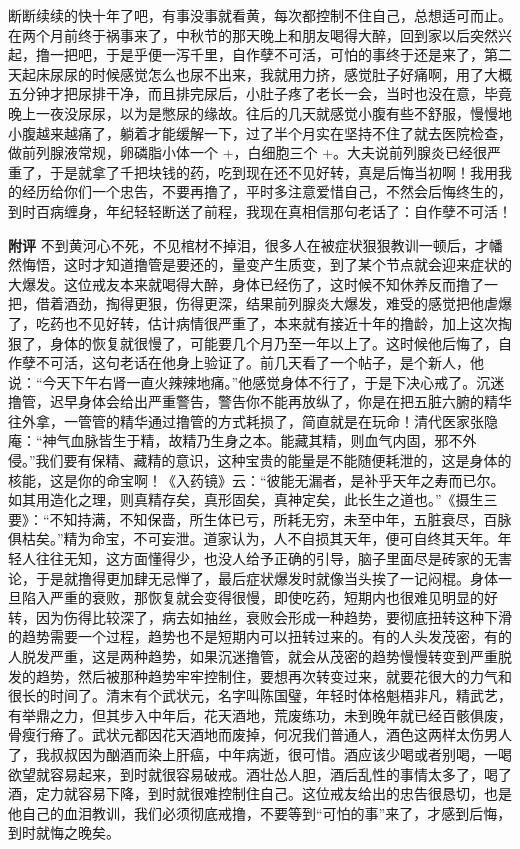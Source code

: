 \begin{case}
    断断续续的快十年了吧，有事没事就看黄，每次都控制不住自己，总想适可而止。在两个月前终于祸事来了，中秋节的那天晚上和朋友喝得大醉，回到家以后突然兴起，撸一把吧，于是乎便一泻千里，自作孽不可活，可怕的事终于还是来了，第二天起床尿尿的时候感觉怎么也尿不出来，我就用力挤，感觉肚子好痛啊，用了大概五分钟才把尿排干净，而且排完尿后，小肚子疼了老长一会，当时也没在意，毕竟晚上一夜没尿尿，以为是憋尿的缘故。往后的几天就感觉小腹有些不舒服，慢慢地小腹越来越痛了，躺着才能缓解一下，过了半个月实在坚持不住了就去医院检查，做前列腺液常规，卵磷脂小体一个 +，白细胞三个 +。大夫说前列腺炎已经很严重了，于是就拿了千把块钱的药，吃到现在还不见好转，真是后悔当初啊！我用我的经历给你们一个忠告，不要再撸了，平时多注意爱惜自己，不然会后悔终生的，到时百病缠身，年纪轻轻断送了前程，我现在真相信那句老话了：自作孽不可活！

    \textbf{附评} 不到黄河心不死，不见棺材不掉泪，很多人在被症状狠狠教训一顿后，才幡然悔悟，这时才知道撸管是要还的，量变产生质变，到了某个节点就会迎来症状的大爆发。这位戒友本来就喝得大醉，身体已经伤了，这时候不知休养反而撸了一把，借着酒劲，掏得更狠，伤得更深，结果前列腺炎大爆发，难受的感觉把他虐爆了，吃药也不见好转，估计病情很严重了，本来就有接近十年的撸龄，加上这次掏狠了，身体的恢复就很慢了，可能要几个月乃至一年以上了。这时候他后悔了，自作孽不可活，这句老话在他身上验证了。前几天看了一个帖子，是个新人，他说：“今天下午右肾一直火辣辣地痛。”他感觉身体不行了，于是下决心戒了。沉迷撸管，迟早身体会给出严重警告，警告你不能再放纵了，你是在把五脏六腑的精华往外拿，一管管的精华通过撸管的方式耗损了，简直就是在玩命！清代医家张隐庵：“神气血脉皆生于精，故精乃生身之本。能藏其精，则血气内固，邪不外侵。”我们要有保精、藏精的意识，这种宝贵的能量是不能随便耗泄的，这是身体的核能，这是你的命宝啊！《入药镜》云：“彼能无漏者，是补乎天年之寿而已尔。如其用造化之理，则真精存矣，真形固矣，真神定矣，此长生之道也。”《摄生三要》：“不知持满，不知保啬，所生体已亏，所耗无穷，未至中年，五脏衰尽，百脉俱枯矣。”精为命宝，不可妄泄。道家认为，人不自损其天年，便可自终其天年。年轻人往往无知，这方面懂得少，也没人给予正确的引导，脑子里面尽是砖家的无害论，于是就撸得更加肆无忌惮了，最后症状爆发时就像当头挨了一记闷棍。身体一旦陷入严重的衰败，那恢复就会变得很慢，即使吃药，短期内也很难见明显的好转，因为伤得比较深了，病去如抽丝，衰败会形成一种趋势，要彻底扭转这种下滑的趋势需要一个过程，趋势也不是短期内可以扭转过来的。有的人头发茂密，有的人脱发严重，这是两种趋势，如果沉迷撸管，就会从茂密的趋势慢慢转变到严重脱发的趋势，然后被那种趋势牢牢控制住，要想再次转变过来，就要花很大的力气和很长的时间了。清末有个武状元，名字叫陈国璧，年轻时体格魁梧非凡，精武艺，有举鼎之力，但其步入中年后，花天酒地，荒废练功，未到晚年就已经百骸俱废，骨瘦行瘠了。武状元都因花天酒地而废掉，何况我们普通人，酒色这两样太伤男人了，我叔叔因为酗酒而染上肝癌，中年病逝，很可惜。酒应该少喝或者别喝，一喝欲望就容易起来，到时就很容易破戒。酒壮怂人胆，酒后乱性的事情太多了，喝了酒，定力就容易下降，到时就很难控制住自己。这位戒友给出的忠告很恳切，也是他自己的血泪教训，我们必须彻底戒撸，不要等到“可怕的事”来了，才感到后悔，到时就悔之晚矣。
\end{case}

